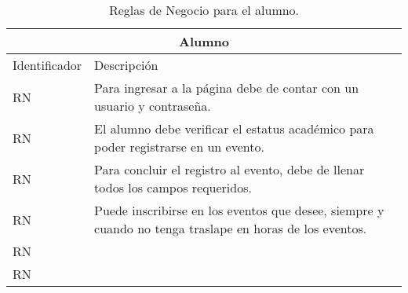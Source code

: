 \begin{table}[hbt!]
	\begin{center}
		\begin{tabular}{|p{30mm}|p{100mm}|}
			\hline
			\multicolumn{2}{|c|}{Alumno} \\ \hline
			Identificador & Descripción \\ \hline 
			RN & Para ingresar a la página debe de contar con un usuario y contraseña.\\ \hline
			RN & El alumno debe verificar el estatus académico para poder registrarse en un evento.\\ \hline
			RN & Para concluir el registro al evento, debe de llenar todos los campos requeridos.\\ \hline
			RN & Puede inscribirse en los eventos que desee, siempre y cuando no tenga traslape en horas de los eventos.\\ \hline
			RN & \\ \hline
			RN & \\ \hline
		\end{tabular}
		\caption{Reglas de Negocio para el alumno.}
		\label{RNA}
	\end{center}
\end{table}
\pagebreak

